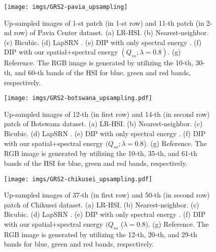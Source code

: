\documentclass[journal]{IEEEtran}
\begin{document}
    \begin{figure}[tb]
        \centering
        \texttt{[image: imgs/GRS2-pavia\_upsampling]}
        \caption{Up-sampled images of 1-st patch (in 1-st row) and 11-th patch (in 2-nd row) of Pavia Center dataset. (a) LR-HSI. (b) Nearest-neighbor. (c) Bicubic. (d) LapSRN \cite{LapSRN}. (e) DIP with only spectral energy \cite{DHP-DARN}. (f) DIP with our spatial+spectral energy $(Q_{ss}; \lambda=0.8)$. (g) Reference. The RGB image is generated by utilizing the 10-th, 30-th, and 60-th bands of the HSI for blue, green and red bands, respectively.}
        \label{fig:pavia_upsampling_comp}
    \end{figure}
    
    \begin{figure}[tb]
        \centering
        \texttt{[image: imgs/GRS2-botswana\_upsampling.pdf]}
        \caption{Up-sampled images of 12-th (in first row) and 14-th (in second row)  patch of Botswana dataset. (a) LR-HSI. (b) Nearest-neighbor. (c) Bicubic. (d) LapSRN \cite{LapSRN}. (e) DIP with only spectral energy \cite{DHP-DARN}. (f) DIP with our spatial+spectral energy $(Q_{ss}; \lambda=0.8$). (g) Reference. The RGB image is generated by utilizing the 10-th, 35-th, and 61-th bands of the HSI for blue, green and red bands, respectively.}
        \label{fig:botswana_upsampling_comp}
    \end{figure}
    
    \begin{figure}[tb]
        \centering
        \texttt{[image: imgs/GRS2-chikusei\_upsampling.pdf]}
        \caption{Up-sampled images of 37-th (in first row) and 50-th (in second row)  patch of Chikusei dataset. (a) LR-HSI. (b) Nearest-neighbor. (c) Bicubic. (d) LapSRN \cite{LapSRN}. (e) DIP with only spectral energy \cite{DHP-DARN}. (f) DIP with our spatial+spectral energy $(Q_{ss}$ ($\lambda=0.8$). (g) Reference. The  RGB image is generated by utilizing the 12-th, 20-th, and 29-th bands for blue, green and red bands, respectively.}
        \label{fig:chikusei_upsample_comp}
    \end{figure}
    
\end{document}
